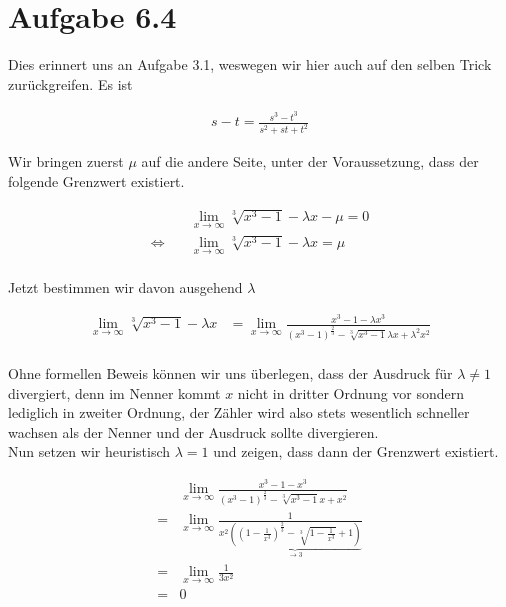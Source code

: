 \documentclass[a4paper,german,12pt,smallheadings]{scrartcl}
\begin{document}
\section*{Aufgabe 6.4}

Dies erinnert uns an Aufgabe 3.1, weswegen wir hier auch auf den selben Trick
zurückgreifen. Es ist

\begin{align*}
  s - t = \frac{s^3 - t^3}{s^2 + st + t^2}
\end{align*}

Wir bringen zuerst $\mu$ auf die andere Seite, unter der Voraussetzung, dass
der folgende Grenzwert existiert.

\begin{align*}
  &\lim_{x \to \infty} \sqrt[3]{x^3 - 1} - \lambda x - \mu = 0\\
  \Leftrightarrow\quad&\lim_{x \to \infty} \sqrt[3]{x^3 - 1} - \lambda x = \mu \\
\end{align*}

Jetzt bestimmen wir davon ausgehend $\lambda$

\begin{align*}
  \lim_{x \to \infty} \sqrt[3]{x^3 - 1} - \lambda x &= \lim_{x \to \infty} \frac{x^3 - 1 - \lambda x^3}{(x^3 - 1)^\frac{2}{3} - \sqrt[3]{x^3 - 1}\lambda x + \lambda^2 x^2} \\
\end{align*}

Ohne formellen Beweis können wir uns überlegen, dass der Ausdruck für $\lambda \neq 1$ divergiert, denn im Nenner kommt
$x$ nicht in dritter Ordnung vor sondern lediglich in zweiter Ordnung, der Zähler wird also stets wesentlich schneller wachsen als der Nenner und der Ausdruck sollte divergieren.\\

Nun setzen wir heuristisch $\lambda = 1$ und zeigen, dass dann der Grenzwert existiert.

\begin{align*}
  &\lim_{x \to \infty} \frac{x^3 - 1 - x^3}{(x^3 - 1)^\frac{2}{3} - \sqrt[3]{x^3 - 1}x + x^2} \\
  =&\lim_{x \to \infty} \frac{1}{x^2 \underbrace{\left(\left(1 - \frac{1}{x^3}\right)^\frac{2}{3} - \sqrt[3]{1 - \frac{1}{x^3}} + 1\right)}_{\to 3}} \\
  =&\lim_{x \to \infty} \frac{1}{3x^2} \\
  =& 0
\end{align*}
\end{document}
